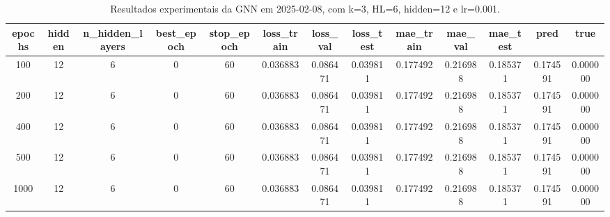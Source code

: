 \begin{table}[h]
\centering
\caption{Resultados experimentais da GNN em 2025-02-08, com k=3, HL=6, hidden=12 e lr=0.001.}
\label{tab:gnn_results_k3_hl6_h12_d20250208}
\begin{tabular}{ccccccccccccc}
\toprule
epochs & hidden & n\_hidden\_layers & best\_epoch & stop\_epoch & loss\_train & loss\_val & loss\_test & mae\_train & mae\_val & mae\_test & pred & true \\
\midrule
100 & 12 & 6 & 0 & 60 & 0.036883 & 0.086471 & 0.039811 & 0.177492 & 0.216988 & 0.185371 & 0.174591 & 0.000000 \\
200 & 12 & 6 & 0 & 60 & 0.036883 & 0.086471 & 0.039811 & 0.177492 & 0.216988 & 0.185371 & 0.174591 & 0.000000 \\
400 & 12 & 6 & 0 & 60 & 0.036883 & 0.086471 & 0.039811 & 0.177492 & 0.216988 & 0.185371 & 0.174591 & 0.000000 \\
500 & 12 & 6 & 0 & 60 & 0.036883 & 0.086471 & 0.039811 & 0.177492 & 0.216988 & 0.185371 & 0.174591 & 0.000000 \\
1000 & 12 & 6 & 0 & 60 & 0.036883 & 0.086471 & 0.039811 & 0.177492 & 0.216988 & 0.185371 & 0.174591 & 0.000000 \\
\bottomrule
\end{tabular}
\end{table}
